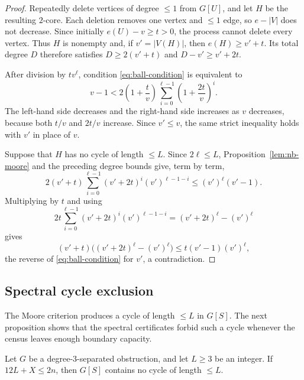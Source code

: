 \begin{proof}
Repeatedly delete vertices of degree \(\le1\) from \(G[U]\), and let
\(H\) be the resulting \(2\)-core.  Each deletion removes one vertex and
\(\le1\) edge, so \(e-|V|\) does not decrease.  Since initially
\(e(U)-v\ge t>0\), the process cannot delete every vertex.  Thus \(H\) is
nonempty and, if \(v'=|V(H)|\), then \(e(H)\ge v'+t\).  Its total degree
\(D\) therefore satisfies \(D\ge2(v'+t)\) and \(D-v'\ge v'+2t\).

After division by \(tv^\ell\), condition \eqref{eq:ball-condition} is
equivalent to
\[
 v-1<2\left(1+\frac tv\right)
 \sum_{i=0}^{\ell-1}\left(1+\frac{2t}{v}\right)^i.
\]
The left-hand side decreases and the right-hand side increases as \(v\)
decreases, because both \(t/v\) and \(2t/v\) increase.  Since \(v'\le v\),
the same strict inequality holds with \(v'\) in place of \(v\).

Suppose that \(H\) has no cycle of length \(\le L\).  Since
\(2\ell\le L\), Proposition~\ref{lem:nb-moore} and the preceding degree
bounds give, term by term,
\[
 2(v'+t)\sum_{i=0}^{\ell-1}(v'+2t)^i(v')^{\ell-1-i}
 \le (v')^\ell(v'-1).
\]
Multiplying by \(t\) and using
\[
 2t\sum_{i=0}^{\ell-1}(v'+2t)^i(v')^{\ell-1-i}
 = (v'+2t)^\ell-(v')^\ell
\]
gives
\[
 (v'+t)\bigl((v'+2t)^\ell-(v')^\ell\bigr)
 \le t(v'-1)(v')^\ell,
\]
the reverse of \eqref{eq:ball-condition} for \(v'\), a contradiction.
\end{proof}

\subsection{Spectral cycle exclusion}

The Moore criterion produces a cycle of length \(\le L\) in \(G[S]\).  The
next proposition shows that the spectral certificates forbid such a cycle
whenever the census leaves enough boundary capacity.

\begin{proposition}
\label{lem:cycle-exclusion}
Let \(G\) be a degree-\(3\)-separated obstruction, and let \(L\ge3\) be an
integer.  If \(12L+X\le2n\), then \(G[S]\) contains no cycle of length
\(\le L\).
\end{proposition}

